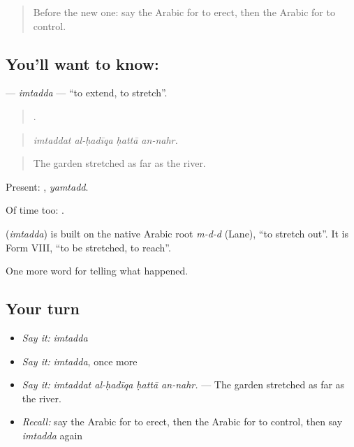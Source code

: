 \label{lesson:AR-C331-imtadda}



\begin{quote}
Before the new one: say the Arabic for to erect, then the Arabic for to control.
\end{quote}

\subsection*{You'll want to know: }
\textbf{} — \emph{imtadda} — \textquotedblleft{}to extend, to stretch\textquotedblright{}.

\begin{quote}
   .
\end{quote}

\begin{quote}
\emph{imtaddat al-ḥadīqa ḥattā an-nahr.}
\end{quote}

\begin{quote}
The garden stretched as far as the river.
\end{quote}

Present: , \emph{yamtadd}.

Of time too:   .

\begin{cousinweb}
\textbf{} (\emph{imtadda}) is built on the native Arabic root \emph{m-d-d} (Lane), \textquotedblleft{}to stretch out\textquotedblright{}. It is Form VIII, \textquotedblleft{}to be stretched, to reach\textquotedblright{}.
\end{cousinweb}

\begin{grammarlens}[title={What you've built}]
One more word for telling what happened.
\end{grammarlens}

\subsection*{Your turn}
\begin{itemize}
\raggedright
  \item \emph{Say it:} \emph{imtadda}
  \item \emph{Say it:} \emph{imtadda}, once more
  \item \emph{Say it:} \emph{imtaddat al-ḥadīqa ḥattā an-nahr.} — The garden stretched as far as the river.
  \item \emph{Recall:} say the Arabic for to erect, then the Arabic for to control, then say \emph{imtadda} again
\end{itemize}

